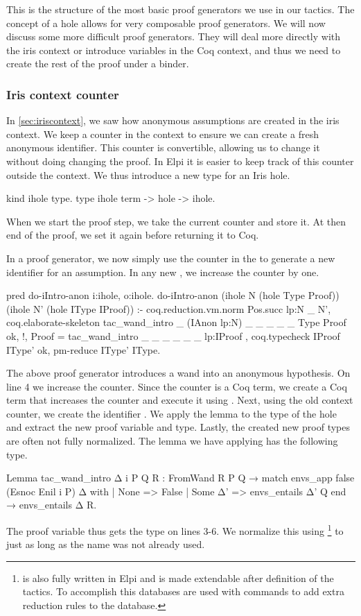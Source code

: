 \documentclass[thesis.tex]{subfiles}
\begin{document}
{{{{This is the structure of the most basic proof generators we use in our tactics. The concept of a hole allows for very composable proof generators. We will now discuss some more difficult proof generators. They will deal more directly with the iris context or introduce variables in the Coq context, and thus we need to create the rest of the proof under a binder.

\subsubsection{Iris context counter}\label{ssec:cecontextcounter}
In \cref{sec:iriscontext}, we saw how anonymous assumptions are created in the iris context. We keep a counter in the context to ensure we can create a fresh anonymous identifier. This counter is convertible, allowing us to change it without doing changing the proof. In Elpi it is easier to keep track of this counter outside the context. We thus introduce a new type for an Iris hole.
\begin{elpicode}
  kind ihole type.
  type ihole term -> hole -> ihole. %
\end{elpicode}
When we start the proof step, we take the current counter and store it. At then end of the proof, we set it again before returning it to Coq.

In a proof generator, we now simply use the counter in the  to generate a new identifier for an assumption. In any new , we increase the counter by one.
\begin{elpicode}
  pred do-iIntro-anon i:ihole, o:ihole.
  do-iIntro-anon (ihole N (hole Type Proof)) 
                 (ihole N' (hole IType IProof)) :-
    coq.reduction.vm.norm {{ Pos.succ lp:N }} _ N',
    coq.elaborate-skeleton 
      {{ tac_wand_intro _ (IAnon lp:N) _ _ _ _ _ }} 
      Type Proof ok, !,
    Proof = {{ tac_wand_intro _ _ _ _ _ _ lp:IProof }}, 
    coq.typecheck IProof IType' ok,
    pm-reduce IType' IType.
\end{elpicode}
The above proof generator introduces a wand into an anonymous hypothesis. On line 4 we increase the counter. Since the counter is a Coq term, we create a Coq term that increases the counter and execute it using . Next, using the old context counter, we create the identifier . We apply the lemma to the type of the hole and extract the new proof variable and type. Lastly, the created new proof types are often not fully normalized. The lemma we have applying has the following type.
\begin{coqcode}
  Lemma tac_wand_intro Δ i P Q R :
    FromWand R P Q →
    match envs_app false (Esnoc Enil i P) Δ with
    | None => False
    | Some Δ' => envs_entails Δ' Q
    end →
    envs_entails Δ R.
\end{coqcode}
The proof variable thus gets the type on lines 3-6. We normalize this using \footnote{ is also fully written in Elpi and is made extendable after definition of the tactics. To accomplish this \ce databases are used with commands to add extra reduction rules to the database.} to just  as long as the name was not already used.


}}}}
\end{document}
